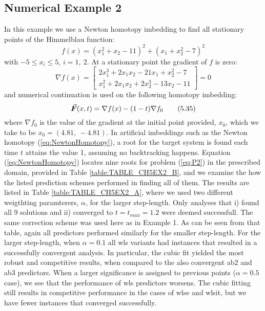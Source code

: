 \subsection{Numerical Example 2}
In this example we use a Newton homotopy imbedding to find all stationary points
of the Himmelblau function:
\begin{equation}
	f(x)=(x_1^2+x_2-11)^2+(x_1+x_2^2-7)^2
	\tag{5.33}\label{eq:HIMMEL}
\end{equation}
with $-5\leq x_i\leq 5$, $i=1,\ 2$. At a stationary point the gradient of $f$ is
zero:
\begin{equation}
	\nabla f(x) = \begin{bmatrix}
		2x_1^3+2x_1x_2-21x_1+x_2^2-7\\
		x_1^2+2x_1x_2+2x_2^3-13x_2-11
	\end{bmatrix}=0
	\tag{5.34}\label{eq:P2}
\end{equation}
and numerical continuation is used on the following homotopy imbedding:
\begin{equation}
	\vec{\bm{F}}(x,t) = \nabla f(x)-(1-t)\nabla f_0
	\tag{5.35}\label{eq:NewtonHomotopy}
\end{equation}
where $\nabla f_0$ is the value of the gradient at the initial point provided,
$x_0$, which we take to be $x_0=(4.81,\ -4.81)$. In artificial imbeddings such
as the Newton homotopy (\ref{eq:NewtonHomotopy}), a root for the target system 
is 
found each time
$t$ attains the value 1, assuming no backtracking happens. Equation 
(\ref{eq:NewtonHomotopy})
locates nine roots for problem (\ref{eq:P2}) in the
prescribed domain, provided in Table \ref{table:TABLE_CH5EX2_B}, and we examine 
the 
how the listed prediction schemes performed in finding all of them.  
The results are listed in Table \ref{table:TABLE_CH5EX2_A}, where we used
two different weigthting paramterers, $\alpha$, for the larger step-length. Only
analyses that i) found all 9 solutions and ii) converged to
$t=t_{max}=1.2$ were deemed successfull. 
The same correction scheme was used here as in Example 1. As can be seen from 
that table, again all predictors performed similarly for the smaller 
step-length. For the larger step-length, when $\alpha=0.1$ all \acrshort{wls} 
variants had instances that resulted in a successfully convergent analysis. In 
particular, the cubic fit yielded the most robust and competitive results, when 
compared to the also convergent \acrshort{ab2} and \acrshort{ab3} predictors. 
When a larger significance is assigned to previous points ($\alpha=0.5$ case), 
we see that the performance of \acrshort{wls} predictors worsens. The cubic 
fitting still results in competitive performance in the cases of 
\acrshort{wlse} and \acrshort{wlsit}, but we have fewer instances that 
converged successfully.

